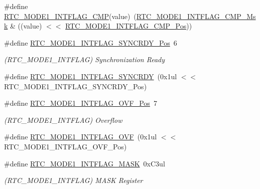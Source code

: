 \begin{DoxyCompactItemize}
\item 
\#define \mbox{\hyperlink{group___s_a_m_d21___r_t_c_gadff4787648e546f69600aa83a5d93be8}{R\+T\+C\+\_\+\+M\+O\+D\+E1\+\_\+\+I\+N\+T\+F\+L\+A\+G\+\_\+\+C\+MP}}(value)~(\mbox{\hyperlink{group___s_a_m_d21___r_t_c_gacaaf8c952c8871a27b9e6c1eeaee7640}{R\+T\+C\+\_\+\+M\+O\+D\+E1\+\_\+\+I\+N\+T\+F\+L\+A\+G\+\_\+\+C\+M\+P\+\_\+\+Msk}} \& ((value) $<$$<$ \mbox{\hyperlink{group___s_a_m_d21___r_t_c_ga6dd45ed1f9690f3407f26fb950160f8a}{R\+T\+C\+\_\+\+M\+O\+D\+E1\+\_\+\+I\+N\+T\+F\+L\+A\+G\+\_\+\+C\+M\+P\+\_\+\+Pos}}))
\item 
\#define \mbox{\hyperlink{group___s_a_m_d21___r_t_c_gafa1274956140bdae4f29899305a6a6a6}{R\+T\+C\+\_\+\+M\+O\+D\+E1\+\_\+\+I\+N\+T\+F\+L\+A\+G\+\_\+\+S\+Y\+N\+C\+R\+D\+Y\+\_\+\+Pos}}~6
\begin{DoxyCompactList}\small\item\em (R\+T\+C\+\_\+\+M\+O\+D\+E1\+\_\+\+I\+N\+T\+F\+L\+AG) Synchronization Ready \end{DoxyCompactList}\item 
\#define \mbox{\hyperlink{group___s_a_m_d21___r_t_c_ga4fa2aad3938fb0913743b715b70503a9}{R\+T\+C\+\_\+\+M\+O\+D\+E1\+\_\+\+I\+N\+T\+F\+L\+A\+G\+\_\+\+S\+Y\+N\+C\+R\+DY}}~(0x1ul $<$$<$ R\+T\+C\+\_\+\+M\+O\+D\+E1\+\_\+\+I\+N\+T\+F\+L\+A\+G\+\_\+\+S\+Y\+N\+C\+R\+D\+Y\+\_\+\+Pos)
\item 
\#define \mbox{\hyperlink{group___s_a_m_d21___r_t_c_ga0ce9c7e6b11e3d4544f9d64384204eff}{R\+T\+C\+\_\+\+M\+O\+D\+E1\+\_\+\+I\+N\+T\+F\+L\+A\+G\+\_\+\+O\+V\+F\+\_\+\+Pos}}~7
\begin{DoxyCompactList}\small\item\em (R\+T\+C\+\_\+\+M\+O\+D\+E1\+\_\+\+I\+N\+T\+F\+L\+AG) Overflow \end{DoxyCompactList}\item 
\#define \mbox{\hyperlink{group___s_a_m_d21___r_t_c_ga0ffb588b3f716a71e5759d0401964df3}{R\+T\+C\+\_\+\+M\+O\+D\+E1\+\_\+\+I\+N\+T\+F\+L\+A\+G\+\_\+\+O\+VF}}~(0x1ul $<$$<$ R\+T\+C\+\_\+\+M\+O\+D\+E1\+\_\+\+I\+N\+T\+F\+L\+A\+G\+\_\+\+O\+V\+F\+\_\+\+Pos)
\item 
\#define \mbox{\hyperlink{group___s_a_m_d21___r_t_c_ga2c1c81902821896ffb3cd940796fb0cd}{R\+T\+C\+\_\+\+M\+O\+D\+E1\+\_\+\+I\+N\+T\+F\+L\+A\+G\+\_\+\+M\+A\+SK}}~0x\+C3ul
\begin{DoxyCompactList}\small\item\em (R\+T\+C\+\_\+\+M\+O\+D\+E1\+\_\+\+I\+N\+T\+F\+L\+AG) M\+A\+SK Register \end{DoxyCompactList}\item 
$$
\end{DoxyCompactItemize}

